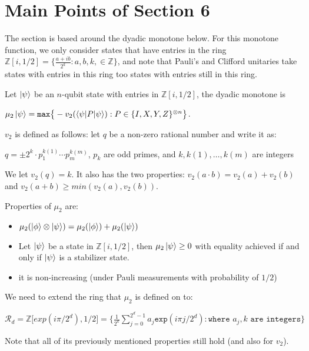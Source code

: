 \documentclass[12pt]{dalthesis}
\begin{document}
\chapter{Main Points of Section 6}
The section is based around the dyadic monotone below. For this monotone function, we only consider states that have entries in the ring $\mathbb{Z}[i, 1/2] = \big\{\frac{a+ib}{2^k}: a, b, k, \in \mathbb{Z} \big\}$, and note that Pauli's and Clifford unitaries take states with entries in this ring too states with entries still in this ring.



\begin{definition}
Let $\ket{\psi}$ be an $n$-qubit state with entries in $\mathbb{Z}[i, 1/2]$, the dyadic monotone is 
\begin{center}
$\mu_2 \ket{\psi} = \texttt{max} \big\{-v_2(\braket{\psi | P | \psi}): P \in \{I, X, Y, Z \}^{\otimes n} \big\}$.
\end{center}
\end{definition}



$v_2$ is defined as follows: let $q$ be a non-zero rational number and write it as:
\begin{center}
$q = \pm 2^k \cdot p_1^{k(1)} \cdots p_m^{k(m)}$, $p_k$ are odd primes, and $k, k(1), \dots , k(m)$ are integers
\end{center}
We let $v_2 (q) = k$. It also has the two properties: $v_2(a \cdot b) = v_2(a) + v_2(b)$ and $v_2(a + b) \geq min(v_2(a), v_2(b))$.


\vspace{5mm}

Properties of $\mu_2$ are:
\begin{itemize}
\item $\mu_2 (\ket{\phi} \otimes \ket{\psi}) = \mu_2 (\ket{\phi}) + \mu_2 (\ket{\psi})$
\item Let $\ket{\psi}$ be a state in $\mathbb{Z}[i, 1/2]$, then $\mu_2 \ket{\psi} \geq 0$ with equality achieved if and only if $\ket{\psi}$ is a stabilizer state.
\item it is non-increasing (under Pauli measurements with probability of $1/2$)
\end{itemize}

\vspace{5mm}

We need to extend the ring that $\mu_2$ is defined on to:
\begin{center}
$\mathcal{R}_d = \mathbb{Z} \big[ exp(i\pi /2^d), 1/2 \big] = \Big\{ \frac{1}{2^k} \sum\limits_{j=0}^{2^d - 1} a_j \texttt{exp}(i\pi j/2^d): \texttt{where } a_j, k \texttt{ are integers} \Big\}$
\end{center}
Note that all of its previously mentioned properties still hold (and also for $v_2$).
\end{document}
